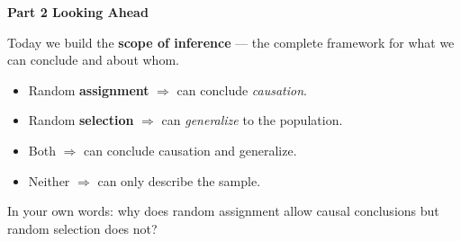\documentclass[10pt]{article}
\begin{document}
\vspace{0.2in}

{\large\bfseries\color{navy} Part 2 \quad Looking Ahead}

\vspace{0.12in}

\noindent Today we build the \textbf{scope of inference} --- the complete framework for
what we can conclude and about whom.

\vspace{0.14in}

\begin{tcolorbox}[colback=greenbg, colframe=greenacc, boxrule=0.8pt, arc=2mm,
    left=4mm, right=4mm, top=3mm, bottom=3mm]
    \small
    \begin{itemize}[leftmargin=1.3em, itemsep=8pt]
  \item Random \textbf{assignment} $\Rightarrow$ can conclude \emph{causation}.
  \item Random \textbf{selection} $\Rightarrow$ can \emph{generalize} to the population.
  \item Both $\Rightarrow$ can conclude causation and generalize.
  \item Neither $\Rightarrow$ can only describe the sample.
    \end{itemize}
\end{tcolorbox}

\vspace{0.2in}

\noindent\textcolor{slate}{\small In your own words: why does random assignment allow
causal conclusions but random selection does not?}\\[8pt]
\writeline\\[2pt]\writeline
\end{document}
